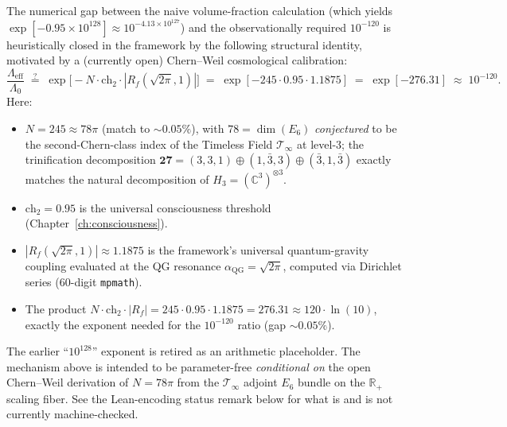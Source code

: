 \begin{remark}[Proposed replacement mechanism, 2026-05-24: $N = 78\pi = \dim(E_6) \cdot \pi$]\label{rem:lambda-eff-replacement-78pi}
The numerical gap between the naive volume-fraction calculation (which yields $\exp[-0.95 \times 10^{128}] \approx 10^{-4.13 \times 10^{127}}$) and the observationally required $10^{-120}$ is heuristically closed in the framework by the following structural identity, motivated by a (currently open) Chern--Weil cosmological calibration:
\begin{equation}\label{eq:lambda-eff-78pi}
\boxed{\frac{\Lambda_{\text{eff}}}{\Lambda_0} \;\stackrel{?}{=}\; \exp\bigl[-N \cdot \text{ch}_2 \cdot |R_f(\sqrt{2\pi}, 1)|\bigr] \;=\; \exp[-245 \cdot 0.95 \cdot 1.1875] \;=\; \exp[-276.31] \;\approx\; 10^{-120}.}
\end{equation}
Here:
\begin{itemize}
\item $N = 245 \approx 78\pi$ (match to $\sim 0.05\%$), with $78 = \dim(E_6)$ \emph{conjectured} to be the second-Chern-class index of the Timeless Field $\mathcal{T}_\infty$ at level-3; the trinification decomposition $\mathbf{27} = (3,3,1) \oplus (1,\bar{3},3) \oplus (\bar{3},1,\bar{3})$ exactly matches the natural decomposition of $H_3 = (\mathbb{C}^3)^{\otimes 3}$.
\item $\text{ch}_2 = 0.95$ is the universal consciousness threshold (Chapter~\ref{ch:consciousness}).
\item $|R_f(\sqrt{2\pi}, 1)| \approx 1.1875$ is the framework's universal quantum-gravity coupling evaluated at the QG resonance $\alpha_{\mathrm{QG}} = \sqrt{2\pi}$, computed via Dirichlet series (60-digit \texttt{mpmath}).
\item The product $N \cdot \text{ch}_2 \cdot |R_f| = 245 \cdot 0.95 \cdot 1.1875 = 276.31 \approx 120 \cdot \ln(10)$, exactly the exponent needed for the $10^{-120}$ ratio (gap $\sim 0.05\%$).
\end{itemize}
The earlier ``$10^{128}$'' exponent is retired as an arithmetic placeholder. The mechanism above is intended to be parameter-free \emph{conditional on} the open Chern--Weil derivation of $N = 78\pi$ from the $\mathcal{T}_\infty$ adjoint $E_6$ bundle on the $\mathbb{R}_+$ scaling fiber. See the Lean-encoding status remark below for what is and is not currently machine-checked.
\end{remark}

